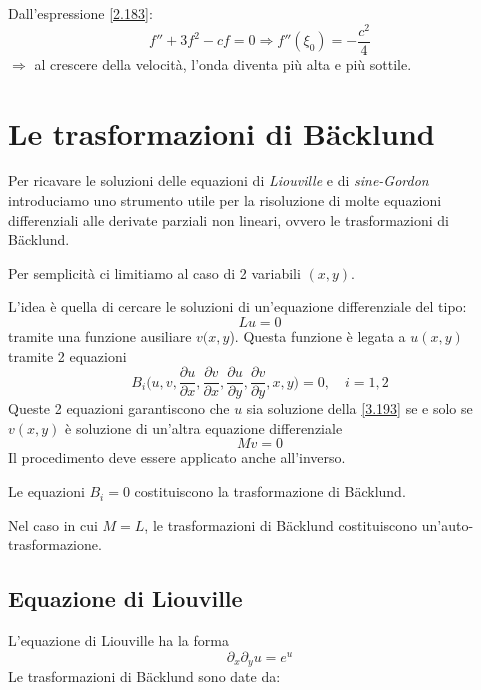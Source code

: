 \documentclass[a4paper,11pt]{report}
\begin{document}
Dall'espressione \eqref{2.183}:
\[
f'' + 3f^2 - cf=0 \Rightarrow f''(\xi_0)=-\frac{c^2}{4}
\]
$\Rightarrow$ al crescere della velocit\`a, l'onda diventa pi\`u alta e pi\`u sottile.

\section{Le trasformazioni di B\"acklund}

Per ricavare le soluzioni delle equazioni di \emph{Liouville} e di \emph{sine-Gordon} introduciamo uno strumento utile per la risoluzione di molte equazioni differenziali alle derivate parziali non lineari, ovvero le trasformazioni di B\"acklund.

Per semplicit\`a ci limitiamo al caso di 2 variabili $(x,y)$.

L'idea \`e quella di cercare le soluzioni di un'equazione differenziale del tipo:
\begin{equation}
L u=0
\label{3.193}
\end{equation}
tramite una funzione ausiliare $v(x,y$). Questa funzione \`e legata a $u(x,y)$ tramite 2 equazioni
\begin{equation}
B_i\Big(u, v, \frac{\partial u}{\partial x}, \frac{\partial v}{\partial x}, \frac{\partial u}{\partial y}, \frac{\partial v}{\partial y}, x, y\Big)=0, \quad i=1,2 
\label{3.194}
\end{equation}
Queste 2 equazioni garantiscono che $u$ sia soluzione della \eqref{3.193} se e solo se $v(x,y)$ \`e soluzione di un'altra equazione differenziale
\begin{equation}
Mv=0 
\label{3.195}
\end{equation}
Il procedimento deve essere applicato anche all'inverso.

Le equazioni $B_i=0$ costituiscono la trasformazione di B\"acklund.

Nel caso in cui $M=L$, le trasformazioni di B\"acklund costituiscono un'auto-trasformazione.

\subsection{Equazione di Liouville}

L'equazione di Liouville ha la forma
\begin{equation}
\partial_x \partial_y u = e^u 
\label{3.196}
\end{equation}
Le trasformazioni di B\"acklund sono date da:
\end{document}
